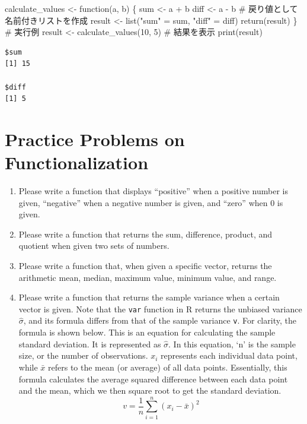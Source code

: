 \documentclass[
  a4paper,
]{book}
\newenvironment{Shaded}{\begin{snugshade}}{\end{snugshade}}
\newcommand{\CommentTok}[1]{\textcolor[rgb]{0.37,0.37,0.37}{#1}}
\newcommand{\ControlFlowTok}[1]{\textcolor[rgb]{0.00,0.23,0.31}{#1}}
\newcommand{\DecValTok}[1]{\textcolor[rgb]{0.68,0.00,0.00}{#1}}
\newcommand{\FunctionTok}[1]{\textcolor[rgb]{0.28,0.35,0.67}{#1}}
\newcommand{\NormalTok}[1]{\textcolor[rgb]{0.00,0.23,0.31}{#1}}
\newcommand{\OtherTok}[1]{\textcolor[rgb]{0.00,0.23,0.31}{#1}}
\newcommand{\SpecialCharTok}[1]{\textcolor[rgb]{0.37,0.37,0.37}{#1}}
\newcommand{\StringTok}[1]{\textcolor[rgb]{0.13,0.47,0.30}{#1}}
\providecommand{\tightlist}{%
  \setlength{\itemsep}{0pt}\setlength{\parskip}{0pt}}\usepackage{longtable,booktabs,array}
\begin{document}
\begin{Shaded}
\begin{Highlighting}[]
\NormalTok{calculate\_values }\OtherTok{\textless{}{-}} \ControlFlowTok{function}\NormalTok{(a, b) \{}
\NormalTok{  sum }\OtherTok{\textless{}{-}}\NormalTok{ a }\SpecialCharTok{+}\NormalTok{ b}
\NormalTok{  diff }\OtherTok{\textless{}{-}}\NormalTok{ a }\SpecialCharTok{{-}}\NormalTok{ b}
  \CommentTok{\# 戻り値として名前付きリストを作成}
\NormalTok{  result }\OtherTok{\textless{}{-}} \FunctionTok{list}\NormalTok{(}\StringTok{"sum"} \OtherTok{=}\NormalTok{ sum, }\StringTok{"diff"} \OtherTok{=}\NormalTok{ diff)}
  \FunctionTok{return}\NormalTok{(result)}
\NormalTok{\}}
\CommentTok{\# 実行例}
\NormalTok{result }\OtherTok{\textless{}{-}} \FunctionTok{calculate\_values}\NormalTok{(}\DecValTok{10}\NormalTok{, }\DecValTok{5}\NormalTok{)}
\CommentTok{\# 結果を表示}
\FunctionTok{print}\NormalTok{(result)}
\end{Highlighting}
\end{Shaded}

\begin{verbatim}
$sum
[1] 15

$diff
[1] 5
\end{verbatim}

\section{Practice Problems on
Functionalization}\label{practice-problems-on-functionalization}

\begin{enumerate}
\def\labelenumi{\arabic{enumi}.}
\tightlist
\item
  Please write a function that displays ``positive'' when a positive
  number is given, ``negative'' when a negative number is given, and
  ``zero'' when 0 is given.
\item
  Please write a function that returns the sum, difference, product, and
  quotient when given two sets of numbers.
\item
  Please write a function that, when given a specific vector, returns
  the arithmetic mean, median, maximum value, minimum value, and range.
\item
  Please write a function that returns the sample variance when a
  certain vector is given. Note that the \texttt{var} function in R
  returns the unbiased variance \(\hat{\sigma}\), and its formula
  differs from that of the sample variance \texttt{v}. For clarity, the
  formula is shown below. This is an equation for calculating the sample
  standard deviation. It is represented as \(\hat{\sigma}\). In this
  equation, `n' is the sample size, or the number of observations.
  \(x_i\) represents each individual data point, while \(\bar{x}\)
  refers to the mean (or average) of all data points. Essentially, this
  formula calculates the average squared difference between each data
  point and the mean, which we then square root to get the standard
  deviation. \[v= \frac{1}{n}\sum_{i=1}^n (x_i - \bar{x})^2 \]
\end{enumerate}
\end{document}
